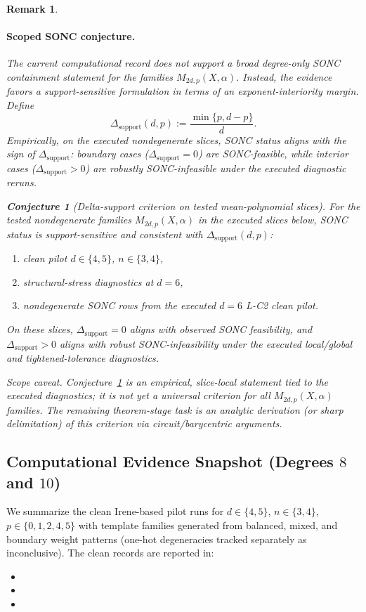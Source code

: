 \documentclass{article}
\newtheorem{remark}{Remark}
\newtheorem{conjecture}{Conjecture}
\begin{document}
\begin{remark}
\paragraph{Scoped SONC conjecture.}
\begin{sloppypar}
The current computational record does not support a broad degree-only SONC
containment statement for the families $M_{2d,p}(X,\alpha)$. Instead, the
evidence favors a support-sensitive formulation in terms of an exponent-interiority
margin. Define
\[
\Delta_{\mathrm{support}}(d,p) := \frac{\min\{p,d-p\}}{d}.
\]
Empirically, on the executed nondegenerate slices, SONC status aligns with the
sign of $\Delta_{\mathrm{support}}$: boundary cases ($\Delta_{\mathrm{support}}=0$)
are SONC-feasible, while interior cases ($\Delta_{\mathrm{support}}>0$) are
robustly SONC-infeasible under the executed diagnostic reruns.
\end{sloppypar}
\begin{conjecture}[Delta-support criterion on tested mean-polynomial slices]
\label{conj:B2_support_sensitive_sonc}
For the tested nondegenerate families $M_{2d,p}(X,\alpha)$ in the executed
slices below, SONC status is support-sensitive and consistent with
$\Delta_{\mathrm{support}}(d,p)$:
\begin{enumerate}
    \item clean pilot $d\in\{4,5\}$, $n\in\{3,4\}$,
    \item structural-stress diagnostics at $d=6$,
    \item nondegenerate SONC rows from the executed $d=6$ L-C2 clean pilot.
\end{enumerate}
On these slices, $\Delta_{\mathrm{support}}=0$ aligns with observed SONC feasibility,
and $\Delta_{\mathrm{support}}>0$ aligns with robust SONC-infeasibility under the
executed local/global and tightened-tolerance diagnostics.
\end{conjecture}

\noindent\textit{Scope caveat.}
Conjecture~\ref{conj:B2_support_sensitive_sonc} is an empirical, slice-local
statement tied to the executed diagnostics; it is not yet a universal criterion
for all $M_{2d,p}(X,\alpha)$ families. The remaining theorem-stage task is an
analytic derivation (or sharp delimitation) of this criterion via
circuit/barycentric arguments.
\end{remark}

\subsection*{Computational Evidence Snapshot (Degrees $8$ and $10$)}
We summarize the clean Irene-based pilot runs for $d \in \{4,5\}$, $n \in \{3,4\}$,
$p \in \{0,1,2,4,5\}$ with template families generated from balanced, mixed, and boundary
weight patterns (one-hot degeneracies tracked separately as inconclusive). The clean records are
reported in:
\begin{itemize}
    \item {}
    \item {}
    \item {}
\end{itemize}
\end{document}
